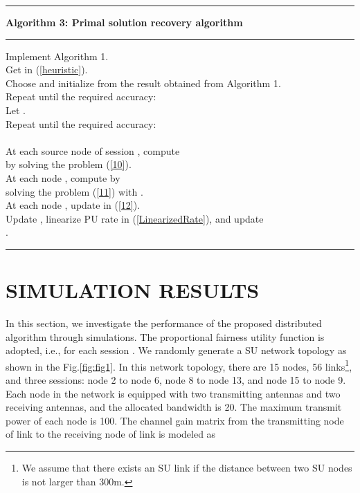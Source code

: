 \documentclass[12pt,onecolumn,tworows]{IEEEtran}
\begin{document}
\noindent\rule{520pt}{1pt}
 \textbf{Algorithm 3: Primal solution recovery algorithm}\\
 \noindent\rule{520pt}{0.65pt}
Implement Algorithm 1.\\
Get  in (\ref{heuristic}).\\
Choose  and initialize  from the result obtained from Algorithm 1.\\
Repeat until the required accuracy:\\
\indent  \indent  Let . \\
\indent  \indent  Repeat until the required accuracy:\\
\indent  \indent \indent \indent \\
\indent  \indent \indent \indent At each source node of session , compute\\
 \indent  \indent \indent \indent  by solving the problem (\ref{10}).\\
 \indent  \indent \indent  \indent  At each node , compute 
 by \\
 \indent  \indent \indent \indent solving the problem (\ref{11}) with .\\
 \indent  \indent \indent  \indent  At each node , update  in (\ref{12}).\\
\indent \indent Update , linearize PU rate in (\ref{LinearizedRate}), and update\\
\indent  \indent .\\
 \noindent\rule{520pt}{1pt}


\section{SIMULATION RESULTS}
In this section, we investigate the performance of the proposed distributed algorithm through simulations. The proportional fairness utility function is adopted, i.e.,  for each session . We randomly generate a SU network topology as shown in the Fig.\ref{fig:fig1}. In this network topology, there are 15 nodes, 56 links\footnote{We assume that there exists an SU link if the distance between two SU nodes is not larger than 300m.}, and three sessions: node 2 to node 6, node 8 to node 13, and node 15 to node 9. Each node in the network is equipped with two transmitting antennas and two receiving antennas, and the allocated bandwidth is 20. The maximum transmit power of each node is 100. The channel gain matrix from the transmitting node of link  to the receiving node of
link  is modeled as
\end{document}
